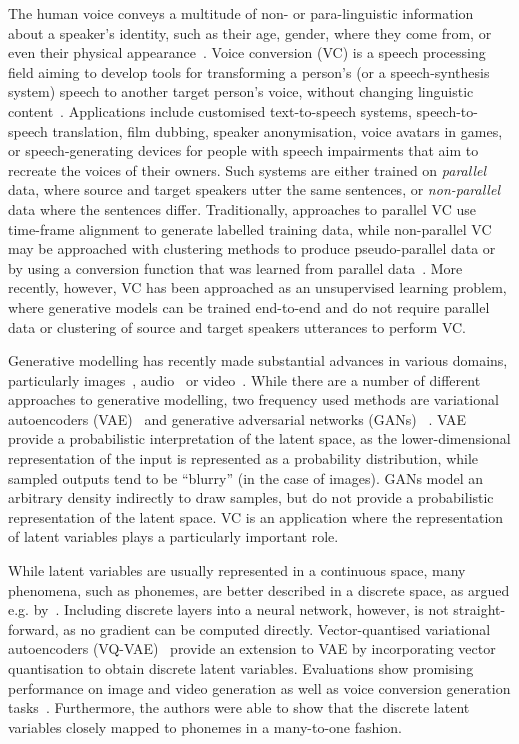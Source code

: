 \documentclass{article}
\begin{document}
The human voice conveys a multitude of non- or para-linguistic information about a speaker's identity, such as their age, gender, where they come from, or even their physical appearance~\citep{Kreiman2011}. Voice conversion (VC) is a speech processing field aiming to develop tools for transforming a person's (or a speech-synthesis system) speech to another target person's voice, without changing linguistic content~\citep{Abe1990}. Applications include customised text-to-speech systems, speech-to-speech translation, film dubbing, speaker anonymisation, voice avatars in games, or speech-generating devices for people with speech impairments that aim to recreate the voices of their owners. Such systems are either trained on \textit{parallel} data, where source and target speakers utter the same sentences, or \textit{non-parallel} data where the sentences differ. Traditionally, approaches to parallel VC use time-frame alignment to generate labelled training data, while non-parallel VC may be approached with clustering methods to produce pseudo-parallel data or by using a conversion function that was learned from parallel data~\citep{Lorenzo2018}. More recently, however, VC has been approached as an unsupervised learning problem, where generative models can be trained end-to-end and do not require parallel data or clustering of source and target speakers utterances to perform VC. 

Generative modelling has recently made substantial advances in various domains, particularly images~\citep{Karras2018}, audio~\citep{Oord2016} or video~\citep{Vondrick2016}. While there are a number of different approaches to generative modelling, two frequency used methods are variational autoencoders (VAE)~\citep{Kingma2013} and generative adversarial networks (GANs) ~\citep{Goodfellow2014}.
VAE provide a probabilistic interpretation of the latent space, as the lower-dimensional representation of the input is represented as a probability distribution, while sampled outputs tend to be ``blurry'' (in the case of images). GANs model an arbitrary density indirectly to draw samples, but do not provide a probabilistic representation of the latent space. 
VC is an application where the representation of latent variables plays a particularly important role.

While latent variables are usually represented in a continuous space, many phenomena, such as phonemes, are better described in a discrete space, as argued e.g.  by~\cite{VandenOord2017}. Including discrete layers into a neural network, however, is not straight-forward, as no gradient can be computed directly. Vector-quantised variational autoencoders (VQ-VAE)~\cite{VandenOord2017} provide an extension to VAE by incorporating vector quantisation to obtain discrete latent variables. Evaluations show promising performance on image and video generation as well as voice conversion generation tasks~\cite{VandenOord2017}. Furthermore, the authors were able to show that the discrete latent variables closely mapped to phonemes in a many-to-one fashion. 
\end{document}
